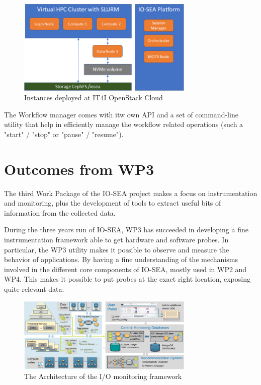 \begin{figure}[H]
    \centering
    \includegraphics[width=0.75\textwidth]{FIGS/it4i.png}
    \caption[Worflow Manager at IT4I]{Instances deployed at IT4I OpenStack Cloud}
    \label{fig:it4i}
\end{figure}

The Workflow manager comes with itw own API and a set of command-line utility that help in efficiently manage
the workflow related operations (such a "start" / "stop" or "pause" / "resume"). 


\section{Outcomes from WP3}

The third Work Package of the IO-SEA project makes a focus on instrumentation and monitoring, plus the
development of tools to extract useful bits of information from the collected data. 

During the three years run of IO-SEA, WP3 has succeeded in developing a fine instrumentation framework able to
get hardware and software probes. In particular, the WP3 utility makes it possible to observe and measure the 
behavior of applications. By having a fine understanding of the mechanisms involved in the different core
components of IO-SEA, mostly used in WP2 and WP4. This makes it possible to put probes at the exact right 
location, exposing quite relevant data.

\begin{figure}[H]
    \centering
    \includegraphics[width=0.75\textwidth]{FIGS/io_instr.png}
    \caption[I/O Monitoring architecture]{ The Architecture of the I/O monitoring framework}
    \label{fig:instr}
\end{figure}

